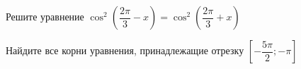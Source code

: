\begin{ex}
	\begin{condition}
		\begin{enumcols}[label=\asbuk*)]
			\item Решите уравнение \( \cos^2{\left(\dfrac{2\pi}{3} - x\right)}=\cos^2{\left(\dfrac{2\pi}{3} + x\right)}   \)
			\item Найдите все корни уравнения, принадлежащие отрезку \( \left[-\dfrac{5\pi}{2};-\pi\right] \)
		\end{enumcols}
	\end{condition}
\end{ex}